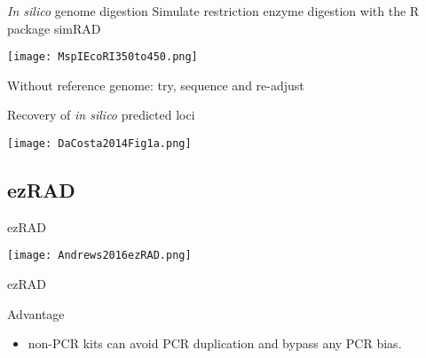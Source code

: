 \documentclass[presentation]{beamer}
\begin{document}
\begin{frame}[label={sec:org060b5c9}]{\emph{In silico} genome digestion}
Simulate restriction enzyme digestion with the R package simRAD \citep{Lepais2014}
\begin{latex}
\begin{center}
\end{latex}
\begin{center}
\texttt{[image: MspIEcoRI350to450.png]}
\end{center}

Without reference genome: try, sequence and re-adjust
\end{frame}

\begin{frame}[label={sec:org4555e5c}]{Recovery of \emph{in silico} predicted loci}
\begin{latex}
\begin{center}
\end{latex}
\begin{center}
\texttt{[image: DaCosta2014Fig1a.png]}
\end{center}

\end{frame}

\subsection{ezRAD}
\label{sec:org1858b21}

\begin{frame}[label={sec:org1018f50}]{ezRAD \citep{Toonen2013}}
\begin{latex}
\begin{center}
\end{latex}
\begin{center}
\texttt{[image: Andrews2016ezRAD.png]}
\end{center}


\end{frame}
\begin{frame}[label={sec:org5d6d954}]{ezRAD \citep{Toonen2013}}
\begin{block}{Advantage}
\begin{itemize}
\item non-PCR kits can avoid PCR duplication and bypass any PCR bias.
\end{itemize}
\end{block}
\end{frame}
\end{document}
